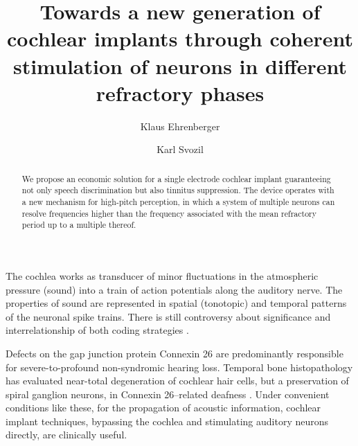 \documentclass[prl,preprint,amsfonts,showpacs,showkeys]{revtex4}
\begin{document}



\title{Towards a new generation of cochlear implants through coherent stimulation of neurons in different refractory phases}

\author{Klaus Ehrenberger}

\author{Karl Svozil}


\begin{abstract}
We propose an economic solution for a single electrode cochlear implant guaranteeing not only speech discrimination but also tinnitus suppression. The device operates with a new mechanism for high-pitch perception, in which a system of multiple neurons can resolve frequencies higher than the frequency associated with the mean refractory period up to a multiple thereof.
\end{abstract}



\maketitle

The cochlea  works as transducer of minor fluctuations in the atmospheric pressure (sound)
into a train of action potentials along the auditory nerve.
The properties of sound are represented in spatial (tonotopic)
and temporal patterns of the neuronal spike trains.
There is still controversy about significance and interrelationship of both coding strategies
\cite{grothe-2000,oxenham-2004}.

Defects on the gap junction protein Connexin 26 are predominantly
responsible for severe-to-profound  non-syndromic hearing loss.
Temporal bone histopathology has evaluated near-total degeneration of cochlear
hair cells, but a preservation of  spiral ganglion neurons,
in Connexin 26--related deafness \cite{jun-2000}.
Under convenient conditions like these, for the propagation of acoustic information,
cochlear implant techniques, bypassing the cochlea and stimulating auditory neurons directly,
are clinically useful.
\end{document}

